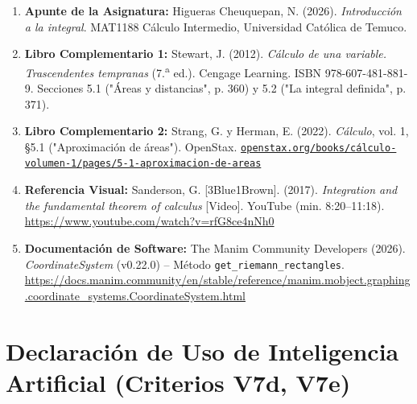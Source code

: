 \documentclass[10pt, a4paper]{article}
\begin{document}
\begin{enumerate}[leftmargin=1.5em, itemsep=2pt, topsep=2pt]
    \item \textbf{Apunte de la Asignatura:} Higueras Cheuquepan, N. (2026). \textit{Introducción a la integral}. MAT1188 Cálculo Intermedio, Universidad Católica de Temuco.
    \item \textbf{Libro Complementario 1:} Stewart, J. (2012). \textit{Cálculo de una variable. Trascendentes tempranas} (7.\textsuperscript{a} ed.). Cengage Learning. ISBN 978-607-481-881-9. Secciones 5.1 ("Áreas y distancias", p. 360) y 5.2 ("La integral definida", p. 371).
    \item \textbf{Libro Complementario 2:} Strang, G. y Herman, E. (2022). \textit{Cálculo}, vol. 1, §5.1 ("Aproximación de áreas"). OpenStax. \href{https://openstax.org/books/c\%C3\%A1lculo-volumen-1/pages/5-1-aproximacion-de-areas}{\nolinkurl{openstax.org/books/cálculo-volumen-1/pages/5-1-aproximacion-de-areas}}
    \item \textbf{Referencia Visual:} Sanderson, G. [3Blue1Brown]. (2017). \textit{Integration and the fundamental theorem of calculus} [Video]. YouTube (min. 8:20--11:18). \url{https://www.youtube.com/watch?v=rfG8ce4nNh0}
    \item \textbf{Documentación de Software:} The Manim Community Developers (2026). \textit{CoordinateSystem} (v0.22.0) -- Método \texttt{get\_riemann\_rectangles}. \url{https://docs.manim.community/en/stable/reference/manim.mobject.graphing.coordinate_systems.CoordinateSystem.html}
\end{enumerate}

\section{Declaración de Uso de Inteligencia Artificial (Criterios V7d, V7e)}
\end{document}

